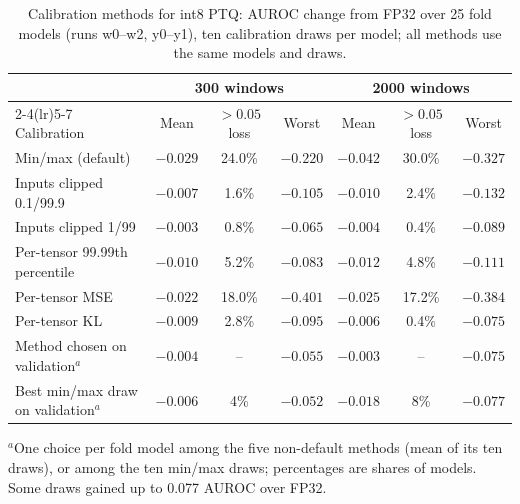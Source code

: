 \documentclass[preprint,12pt]{elsarticle}
\begin{document}
\begin{table}[t]
\caption{Calibration methods for int8 PTQ: AUROC change from FP32 over 25 fold models (runs w0--w2, y0--y1), ten calibration draws per model; all methods use the same models and draws.}
\label{tab:clip}
\centering\scriptsize
\setlength{\tabcolsep}{3pt}
\begin{tabular*}{\linewidth}{@{\extracolsep{\fill}}lcccccc@{}}
\toprule
 & \multicolumn{3}{c}{300 windows} & \multicolumn{3}{c}{2000 windows} \\
\cmidrule(lr){2-4}\cmidrule(lr){5-7}
Calibration & Mean & $>0.05$ loss & Worst & Mean & $>0.05$ loss & Worst \\
\midrule
Min/max (default) & $-0.029$ & 24.0\% & $-0.220$ & $-0.042$ & 30.0\% & $-0.327$ \\
Inputs clipped 0.1/99.9 & $-0.007$ & 1.6\% & $-0.105$ & $-0.010$ & 2.4\% & $-0.132$ \\
Inputs clipped 1/99 & $-0.003$ & 0.8\% & $-0.065$ & $-0.004$ & 0.4\% & $-0.089$ \\
Per-tensor 99.99th percentile & $-0.010$ & 5.2\% & $-0.083$ & $-0.012$ & 4.8\% & $-0.111$ \\
Per-tensor MSE & $-0.022$ & 18.0\% & $-0.401$ & $-0.025$ & 17.2\% & $-0.384$ \\
Per-tensor KL & $-0.009$ & 2.8\% & $-0.095$ & $-0.006$ & 0.4\% & $-0.075$ \\
\midrule
Method chosen on validation$^a$ & $-0.004$ & -- & $-0.055$ & $-0.003$ & -- & $-0.075$ \\
Best min/max draw on validation$^a$ & $-0.006$ & 4\% & $-0.052$ & $-0.018$ & 8\% & $-0.077$ \\
\bottomrule
\end{tabular*}

\smallskip
\parbox{\linewidth}{\scriptsize $^a$One choice per fold model among the five non-default methods (mean of its ten draws), or among the ten min/max draws; percentages are shares of models. Some draws gained up to 0.077 AUROC over FP32.}
\end{table}
\end{document}
